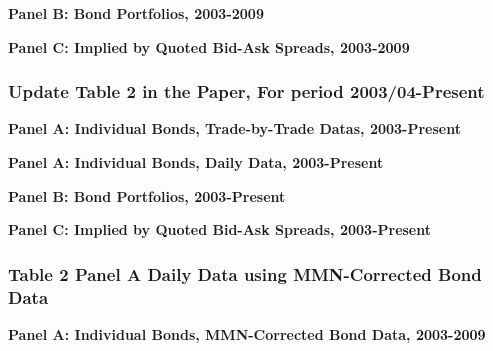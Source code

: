 \documentclass{article}
\newcommand*{\PathToOutput}{../output/}%
\begin{document}
\begin{table}[hbt!]
\centering
\textbf{\large Panel B: Bond Portfolios, 2003-2009}

\label{table:table2_panelB_paper}
\end{table}

\begin{table}[hbt!]
\centering
\textbf{\large Panel C: Implied by Quoted Bid-Ask Spreads, 2003-2009}

\label{table:table2_panelC_paper}
\end{table}


\subsubsection{Update Table 2 in the Paper, For period 2003/04-Present}

\begin{table}[hbt!]
\centering
\textbf{\large Panel A: Individual Bonds, Trade-by-Trade Datas, 2003-Present}
\resizebox{\textwidth}{!}{%
    
}
\label{table:table2_panelA_trade_by_trade_new}
\end{table}

\begin{table}[hbt!]
\centering
\textbf{\large Panel A: Individual Bonds, Daily Data, 2003-Present}
\resizebox{\textwidth}{!}{%
    
}
\label{table:table2_panelA_daily_new}
\end{table}


\begin{table}[hbt!]
\centering
\textbf{\large Panel B: Bond Portfolios, 2003-Present}
\resizebox{\textwidth}{!}{%
    
}
\label{table:table2_panelB_new}
\end{table}


\begin{table}[hbt!]
\centering
\textbf{\large Panel C: Implied by Quoted Bid-Ask Spreads, 2003-Present}
\resizebox{\textwidth}{!}{%
    
}
\label{table:table2_panelC_new}
\end{table}


\subsubsection{Table 2 Panel A Daily Data using MMN-Corrected Bond Data}


\begin{table}[hbt!]
\centering
\textbf{\large Panel A: Individual Bonds, MMN-Corrected Bond Data, 2003-2009}

\label{table:table2_panelA_daily_mmn_paper}
\end{table}
\end{document}
